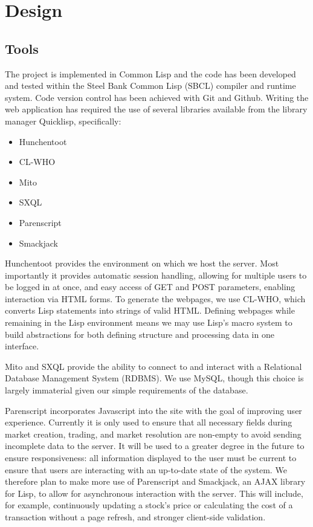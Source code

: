 \section{Design}


\label{sec:design}

\subsection{Tools}

The project is implemented in Common Lisp and the code has been developed and
tested within the Steel Bank Common Lisp (SBCL) compiler and runtime system.
Code version control has been achieved with Git and Github.  Writing the web
application has required the use of several libraries available from the
library manager Quicklisp, specifically:

\begin{itemize}
	\itemsep0em
	\item Hunchentoot
	\item CL-WHO
	\item Mito
	\item SXQL
	\item Parenscript
	\item Smackjack
\end{itemize}

Hunchentoot provides the environment on which we host the server. Most
importantly it provides automatic session handling, allowing for multiple users
to be logged in at once, and easy access of GET and POST parameters, enabling
interaction via HTML forms. To generate the webpages, we use CL-WHO, which
converts Lisp statements into strings of valid HTML. Defining webpages while
remaining in the Lisp environment means we may use Lisp's macro system to build
abstractions for both defining structure and processing data in one interface.

Mito and SXQL provide the ability to connect to and interact with a Relational
Database Management System (RDBMS). We use MySQL, though this choice is largely
immaterial given our simple requirements of the database.

Parenscript incorporates Javascript into the site with the goal of improving
user experience. Currently it is only used to ensure that all necessary fields
during market creation, trading, and market resolution are non-empty to avoid
sending incomplete data to the server. It will be used to a greater degree in
the future to ensure responsiveness: all information displayed to the user must
be current to ensure that users are interacting with an up-to-date state of the
system. We therefore plan to make more use of Parenscript and Smackjack, an
AJAX library for Lisp, to allow for asynchronous interaction with the server.
This will include, for example, continuously updating a stock's price or
calculating the cost of a transaction without a page refresh, and stronger
client-side validation.

